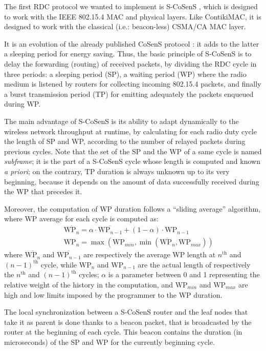 \documentclass[12pt,a4paper]{article}
\begin{document}
The first RDC protocol we wanted to implement is S-CoSenS \cite{TheseBNefzi},
which is designed to work with the IEEE 802.15.4 MAC and physical layers.
Like ContikiMAC, it is designed to work with the classical
(i.e.: beacon-less) CSMA/CA MAC layer.

It is an evolution of the already published CoSenS protocol \cite{CosensConf}:
it adds to the latter a sleeping period for energy saving.
Thus, the basic principle of S-CoSenS is to delay the forwarding (routing)
of received packets, by dividing the RDC cycle in three periods:
a sleeping period (SP), a waiting period (WP) where the radio medium
is listened by routers for collecting incoming 802.15.4 packets, and
finally a burst transmission period (TP) for emitting adequately
the packets enqueued during WP.

The main advantage of S-CoSenS is its ability to adapt dynamically to the
wireless network throughput at runtime, by calculating for each radio duty
cycle the length of SP and WP, according to the number of relayed
packets during previous cycles. Note that the set of the SP and the WP
of a same cycle is named \emph{subframe}; it is the part of a S-CoSenS
cycle whose length is computed and known \textit{a priori}; on the contrary,
TP duration is always unknown up to its very beginning, because it depends
on the amount of data successfully received during the WP that precedes it.

Moreover, the computation of WP duration follows a ``sliding average''
algorithm, where WP average for each cycle is computed as:
\begin{eqnarray*}
&&
\overline{\mathrm{WP}_{n}} = \alpha \cdot \overline{\mathrm{WP}_{n-1}}
                + (1 - \alpha) \cdot \mathrm{WP}_{n-1}
\\ &&
\mathrm{WP}_{n} = \max ( \mathrm{WP}_{min},
                  \min ( \overline{\mathrm{WP}_{n}}, \mathrm{WP}_{max} ) )
\end{eqnarray*}
where $\overline{\mathrm{WP}_{n}}$ and $\overline{\mathrm{WP}_{n-1}}$
are respectively the average WP length at $n^{\mathrm{th}}$ and
$(n-1)^{\mathrm{th}}$ cycle, while $\mathrm{WP}_{n}$ and $\mathrm{WP}_{n-1}$
are the actual length of respectively the $n^{\mathrm{th}}$ and
$(n-1)^{\mathrm{th}}$ cycles; $\alpha$ is a parameter between 0 and 1
representing the relative weight of the history in the computation,
and $\mathrm{WP}_{min}$ and $\mathrm{WP}_{max}$ are high and low limits
imposed by the programmer to the WP duration.

The local synchronization between a S-CoSenS router and the leaf nodes
that take it as parent is done thanks to a beacon packet, that is broadcasted
by the router at the beginning of each cycle. This beacon contains the
duration (in microseconds) of the SP and WP for the currently beginning cycle.
\end{document}
